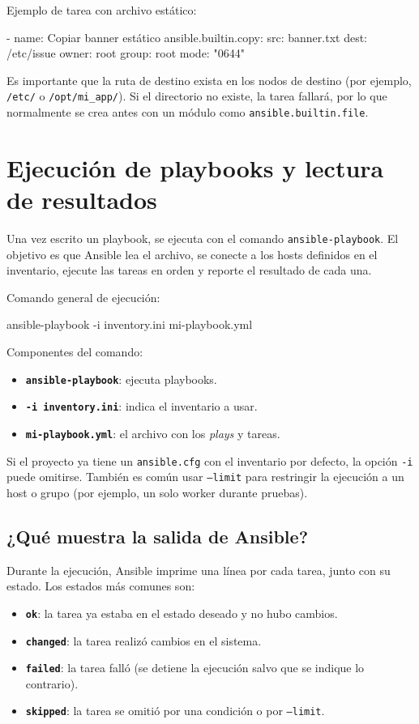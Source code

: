 Ejemplo de tarea con archivo estático:
\begin{yamlcode}
- name: Copiar banner estático
  ansible.builtin.copy:
    src: banner.txt
    dest: /etc/issue
    owner: root
    group: root
    mode: "0644"
\end{yamlcode}

Es importante que la ruta de destino exista en los nodos de destino (por ejemplo, \texttt{/etc/} o \texttt{/opt/mi\_app/}). Si el directorio no existe, la tarea fallará, por lo que normalmente se crea antes con un módulo como \texttt{ansible.builtin.file}.

\section{Ejecución de playbooks y lectura de resultados}
\label{sec:ansible_ejecucion_playbooks}

Una vez escrito un playbook, se ejecuta con el comando \texttt{ansible-playbook}. El objetivo es que Ansible lea el archivo, se conecte a los hosts definidos en el inventario, ejecute las tareas en orden y reporte el resultado de cada una.

Comando general de ejecución:
\begin{bashcode}
ansible-playbook -i inventory.ini mi-playbook.yml
\end{bashcode}

Componentes del comando:
\begin{itemize}
  \item \textbf{\texttt{ansible-playbook}}: ejecuta playbooks.
  \item \textbf{\texttt{-i inventory.ini}}: indica el inventario a usar.
  \item \textbf{\texttt{mi-playbook.yml}}: el archivo con los \textit{plays} y tareas.
\end{itemize}

Si el proyecto ya tiene un \texttt{ansible.cfg} con el inventario por defecto, la opción \texttt{-i} puede omitirse. También es común usar \texttt{--limit} para restringir la ejecución a un host o grupo (por ejemplo, un solo worker durante pruebas).

\subsection{¿Qué muestra la salida de Ansible?}
\label{subsec:ansible_output}

Durante la ejecución, Ansible imprime una línea por cada tarea, junto con su estado. Los estados más comunes son:
\begin{itemize}
  \item \textbf{\texttt{ok}}: la tarea ya estaba en el estado deseado y no hubo cambios.
  \item \textbf{\texttt{changed}}: la tarea realizó cambios en el sistema.
  \item \textbf{\texttt{failed}}: la tarea falló (se detiene la ejecución salvo que se indique lo contrario).
  \item \textbf{\texttt{skipped}}: la tarea se omitió por una condición o por \texttt{--limit}.
\end{itemize}

